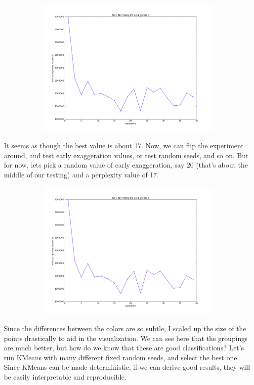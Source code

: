 \documentclass[20pt]{article} %
\begin{document}
\begin{figure}[!htbp]
  	\centering
   	\begin{subfigure}[p]{0.6\linewidth}
    	\includegraphics[width=\linewidth]{./figures/best_perp.png}
   	\end{subfigure}
\end{figure}
It seems as though the best value is about 17.  Now, we can flip the experiment around, and test early exaggeration values, or test random seeds, and so on.  But for now, lets pick a random value of early exaggeration, say 20 (that's about the middle of our testing) and a perplexity value of 17.
\begin{figure}[!htbp]
  	\centering
   	\begin{subfigure}[p]{0.8\linewidth}
    	\includegraphics[width=\linewidth]{./figures/best_perp.png}
   	\end{subfigure}
\end{figure}
Since the differences between the colors are so subtle, I scaled up the size of the points drastically to aid in the visualization.  We can see here that the groupings are much better, but how do we know that these are good classifications?  Let's run KMeans with many different fixed random seeds, and select the best one. Since KMeans can be made deterministic, if we can derive good results, they will be easily interpretable and reproducible.  
\end{document}
